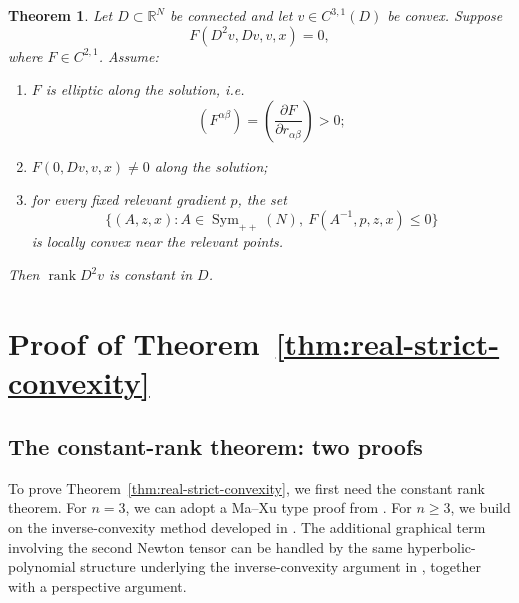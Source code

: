 \documentclass{article}
\newtheorem{theorem}{Theorem}[section]
\newcommand{\R}{\mathbb R}
\newcommand{\Sym}{\operatorname{Sym}}
\newcommand{\rank}{\operatorname{rank}}
\numberwithin{equation}{section}
\begin{document}
\begin{theorem}\label{thm:BG}
Let $D\subset\R^N$ be connected and let $v\in C^{3,1}(D)$ be convex. Suppose
\[
F(D^2v,Dv,v,x)=0,
\]
where $F\in C^{2,1}$. Assume:
\begin{enumerate}[label=\textup{(\roman*)}]
\item $F$ is elliptic along the solution, i.e.
\[
(F^{\alpha\beta})=\left(\frac{\partial F}{\partial r_{\alpha\beta}}\right)>0;
\]
\item $F(0,Dv,v,x)\neq0$ along the solution;
\item for every fixed relevant gradient $p$, the set
\begin{equation}\label{eq:BGlevel}
\{(A,z,x):A\in\Sym_{++}(N),\ F(A^{-1},p,z,x)\le0\}
\end{equation}
is locally convex near the relevant points.
\end{enumerate}
Then $\rank D^2v$ is constant in $D$.
\end{theorem}

% 


\section{Proof of Theorem~\ref{thm:real-strict-convexity}}\label{sec:proofs}

\subsection{The constant-rank theorem: two proofs}\label{real-const-thm}

To prove Theorem~\ref{thm:real-strict-convexity}, we first need  the constant rank theorem. For $n=3$, we can adopt a Ma–Xu type proof from \cite{MX08}. For $n\geq 3$, we build on the inverse-convexity method developed in \cite{LMS26}. The additional graphical term involving the second Newton tensor can be handled by the same hyperbolic-polynomial structure underlying the inverse-convexity argument in \cite{LMS26}, together with a perspective argument.
\end{document}
